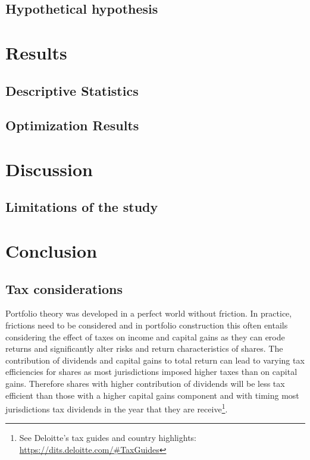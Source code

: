 \documentclass[11pt,preprint, authoryear]{elsarticle}
\numberwithin{equation}{section}
\numberwithin{figure}{section}
\numberwithin{table}{section}
\let\rmarkdownfootnote\footnote%
\def\footnote{\protect\rmarkdownfootnote}
\begin{document}
\hypertarget{hypothetical-hypothesis}{%
\subsection{Hypothetical hypothesis}\label{hypothetical-hypothesis}}

\hypertarget{results}{%
\section{Results}\label{results}}

\hypertarget{descriptive-statistics}{%
\subsection{Descriptive Statistics}\label{descriptive-statistics}}

\hypertarget{optimization-results}{%
\subsection{Optimization Results}\label{optimization-results}}

\hypertarget{discussion}{%
\section{Discussion}\label{discussion}}

\hypertarget{limitations-of-the-study}{%
\subsection{Limitations of the study}\label{limitations-of-the-study}}

\hypertarget{conclusion}{%
\section{Conclusion}\label{conclusion}}

\hypertarget{tax-considerations}{%
\subsection{Tax considerations}\label{tax-considerations}}

Portfolio theory was developed in a perfect world without friction. In
practice, frictions need to be considered and in portfolio construction
this often entails considering the effect of taxes on income and capital
gains as they can erode returns and significantly alter risks and return
characteristics of shares. The contribution of dividends and capital
gains to total return can lead to varying tax efficiencies for shares as
most jurisdictions imposed higher taxes than on capital gains. Therefore
shares with higher contribution of dividends will be less tax efficient
than those with a higher capital gains component and with timing most
jurisdictions tax dividends in the year that they are
receive\footnote{See Deloitte's tax guides and country highlights:
  \url{https://dits.deloitte.com/\#TaxGuides}}.
\end{document}
